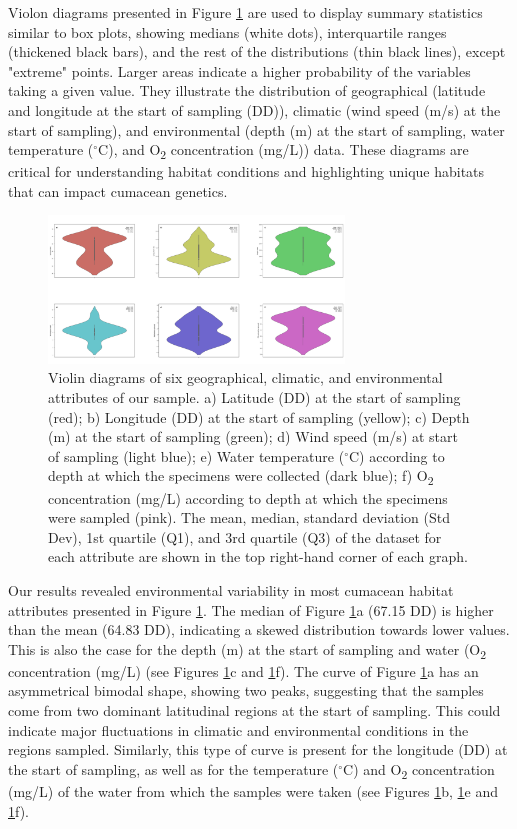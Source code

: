 Violon diagrams presented in Figure \ref{fig:fig1} are used to display summary statistics similar to box plots, showing medians (white dots), interquartile ranges (thickened black bars), and the rest of the distributions (thin black lines), except "extreme" points. Larger areas indicate a higher probability of the variables taking a given value. They illustrate the distribution of geographical (latitude and longitude at the start of sampling (DD)), climatic (wind speed (m/s) at the start of sampling), and environmental (depth (m) at the start of sampling, water temperature ($^\circ$C), and O\textsubscript{2} concentration (mg/L)) data. These diagrams are critical for understanding habitat conditions and highlighting unique habitats that can impact cumacean genetics. 

\begin{figure}[htbp]
    \centering
    \includegraphics[width=0.7\textwidth]{figure1.jpg}
    \caption{Violin diagrams of six geographical, climatic, and environmental attributes of our sample. a) Latitude (DD) at the start of sampling (red); b) Longitude (DD) at the start of sampling (yellow); c) Depth (m) at the start of sampling (green); d) Wind speed (m/s) at start of sampling (light blue); e) Water temperature ($^\circ$C) according to depth at which the specimens were collected (dark blue); f) O\textsubscript{2} concentration (mg/L) according to depth at which the specimens were sampled (pink). The mean, median, standard deviation (Std Dev), 1st quartile (Q1), and 3rd quartile (Q3) of the dataset for each attribute are shown in the top right-hand corner of each graph. \label{fig:fig1}}
\end{figure}

Our results revealed environmental variability in most cumacean habitat attributes presented in Figure \ref{fig:fig1}. The median of Figure \ref{fig:fig1}a (67.15 DD) is higher than the mean (64.83 DD), indicating a skewed distribution towards lower values. This is also the case for the depth (m) at the start of sampling and water (O\textsubscript{2} concentration (mg/L) (see Figures \ref{fig:fig1}c and \ref{fig:fig1}f). The curve of Figure \ref{fig:fig1}a has an asymmetrical bimodal shape, showing two peaks, suggesting that the samples come from two dominant latitudinal regions at the start of sampling. This could indicate major fluctuations in climatic and environmental conditions in the regions sampled. Similarly, this type of curve is present for the longitude (DD) at the start of sampling, as well as for the temperature ($^\circ$C) and O\textsubscript{2} concentration (mg/L) of the water from which the samples were taken (see Figures \ref{fig:fig1}b, \ref{fig:fig1}e and \ref{fig:fig1}f). 

